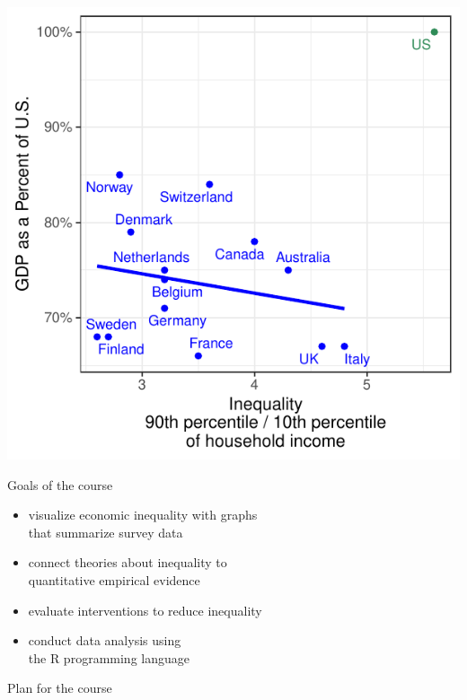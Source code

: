 \documentclass{beamer}
\newcommand\bref[2]{\href{#1}{\color{blue}{#2}}}
\begin{document}
\begin{frame}
\includegraphics[width = .8\textwidth]{jencks_table1_dropUS}
\end{frame}

\begin{frame}{Goals of the course}

\begin{itemize}
\item visualize economic inequality with graphs\\that summarize survey data
\item connect theories about inequality to\\quantitative empirical evidence
\item evaluate interventions to reduce inequality
\item conduct data analysis using\\the R programming language
\end{itemize}
\end{frame}

\begin{frame}{Plan for the course}

\huge \bref{https://info3370.github.io/}{info3370.github.io}

\end{frame}
\end{document}
